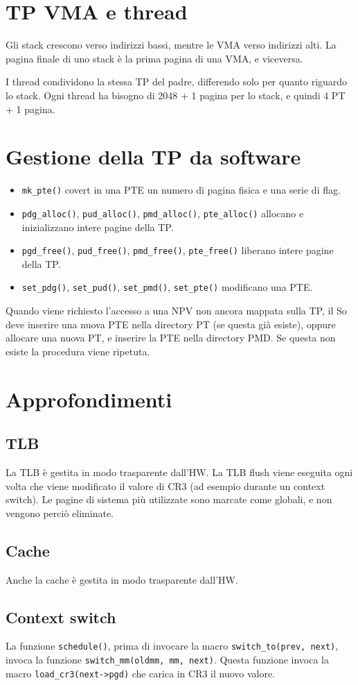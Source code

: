 \documentclass[12pt, a4paper]{report}
\begin{document}
\section{TP VMA e thread}
Gli stack crescono verso indirizzi bassi, mentre le VMA verso indirizzi alti.
La pagina finale di uno stack è la prima pagina di una VMA, e viceversa.

I thread condividono la stessa TP del padre, differendo solo per quanto riguardo
lo stack. Ogni thread ha bisogno di 2048 + 1 pagina per lo stack, e quindi 4 PT
+ 1 pagina.

\section{Gestione della TP da software}
\begin{itemize}
	\item \texttt{mk\_pte()} covert in una PTE un numero di pagina fisica e
		una serie di flag. 
	\item \texttt{pdg\_alloc()}, \texttt{pud\_alloc()}, \texttt{pmd\_alloc()},
		\texttt{pte\_alloc()} allocano e inizializzano intere pagine della TP.
	\item \texttt{pgd\_free()}, \texttt{pud\_free()}, \texttt{pmd\_free()},
		\texttt{pte\_free()} liberano intere pagine della TP.
	\item \texttt{set\_pdg()}, \texttt{set\_pud()}, \texttt{set\_pmd()},
		\texttt{set\_pte()} modificano una PTE.
\end{itemize}
Quando viene richiesto l'accesso a una NPV non ancora mappata sulla TP, il So
deve inserire una nuova PTE nella directory PT (se questa già esiste), oppure
allocare una nuova PT, e inserire la PTE nella directory PMD. Se questa non
esiste la procedura viene ripetuta.

\section{Approfondimenti}
\subsection{TLB}
La TLB è gestita in modo trasparente dall'HW. La TLB flush viene eseguita ogni
volta che viene modificato il valore di CR3 (ad esempio durante un context
switch). Le pagine di sistema più utilizzate sono marcate come globali, e non
vengono perciò eliminate.

\subsection{Cache}
Anche la cache è gestita in modo trasparente dall'HW.

\subsection{Context switch}
La funzione \texttt{schedule()}, prima di invocare la macro
\texttt{switch\_to(prev, next)}, invoca la funzione \texttt{switch\_mm(oldmm,
mm, next)}. Questa funzione invoca la macro \texttt{load\_cr3(next->pgd)} che
carica in CR3 il nuovo valore.
\end{document}
